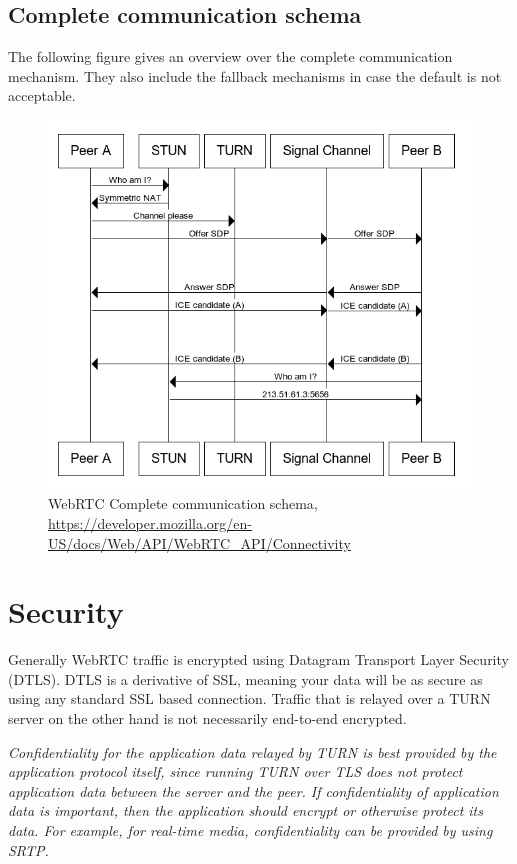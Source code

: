 \subsection{Complete communication schema}
The following figure gives an overview over the complete communication mechanism. They also include the fallback mechanisms in case the default is not acceptable.
\begin{figure}[H]
	\includegraphics[scale=0.5]{images/webrtc-complete-diagram.png}
	\centering
	\caption{WebRTC Complete communication schema, \url{https://developer.mozilla.org/en-US/docs/Web/API/WebRTC_API/Connectivity}}
	\label{fig:WebRTC}
\end{figure}

\section{Security}
Generally WebRTC traffic is encrypted using Datagram Transport Layer Security (DTLS). DTLS is a derivative of SSL, meaning your data will be as secure as using any standard SSL based connection. Traffic that is relayed over a TURN server on the other hand is not necessarily end-to-end encrypted.

\textit{Confidentiality for the application data relayed by TURN is best provided by the application protocol itself, since running TURN over TLS does not protect application data between the server and the peer. If confidentiality of application data is important, then the application should encrypt or otherwise protect its data. For example, for real-time media, confidentiality can be provided by using SRTP.}~\cite{TURN:sec}

